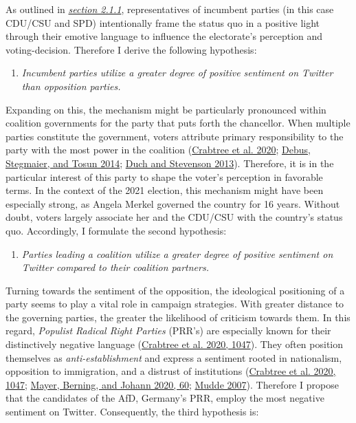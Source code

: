 \documentclass[a4paper,11pt]{article}
\begin{document}
As outlined in \protect\hyperlink{emotivestrategies}{\emph{section 2.1.1}}, representatives of incumbent parties (in this case CDU/CSU and SPD) intentionally frame the status quo in a positive light through their emotive language to influence the electorate's perception and voting-decision. Therefore I derive the following hypothesis:
\begin{center}
  \begin{enumerate}[label=\textit{H1}]
    \item \textit{Incumbent parties utilize a greater degree of positive sentiment on Twitter than opposition parties.}\label{hypothesis:H1}
  \end{enumerate}
\end{center}
Expanding on this, the mechanism might be particularly pronounced within coalition governments for the party that puts forth the chancellor. When multiple parties constitute the government, voters attribute primary responsibility to the party with the most power in the coalition (\protect\hyperlink{ref-crabtreeItNotOnly2020}{Crabtree et al. 2020}; \protect\hyperlink{ref-debusEconomicVotingCoalition2014}{Debus, Stegmaier, and Tosun 2014}; \protect\hyperlink{ref-duchVoterPerceptionsAgenda2013}{Duch and Stevenson 2013}). Therefore, it is in the particular interest of this party to shape the voter's perception in favorable terms. In the context of the 2021 election, this mechanism might have been especially strong, as Angela Merkel governed the country for 16 years. Without doubt, voters largely associate her and the CDU/CSU with the country's status quo.
Accordingly, I formulate the second hypothesis:
\begin{center}
  \begin{enumerate}[label=\textit{H2}]
    \item \textit{Parties leading a coalition utilize a greater degree of positive sentiment on Twitter compared to their coalition partners.}\label{hypothesis:H2}
  \end{enumerate}
\end{center}
Turning towards the sentiment of the opposition, the ideological positioning of a party seems to play a vital role in campaign strategies. With greater distance to the governing parties, the greater the likelihood of criticism towards them. In this regard, \emph{Populist Radical Right Parties} (PRR's) are especially known for their distinctively negative language (\protect\hyperlink{ref-crabtreeItNotOnly2020}{Crabtree et al. 2020, 1047}). They often position themselves as \emph{anti-establishment} and express a sentiment rooted in nationalism, opposition to immigration, and a distrust of institutions (\protect\hyperlink{ref-crabtreeItNotOnly2020}{Crabtree et al. 2020, 1047}; \protect\hyperlink{ref-mayerTwoDimensionsNarcissistic2020}{Mayer, Berning, and Johann 2020, 60}; \protect\hyperlink{ref-muddePopulistRadicalRight2007}{Mudde 2007}). Therefore I propose that the candidates of the AfD, Germany's PRR, employ the most negative sentiment on Twitter. Consequently, the third hypothesis is:
\end{document}
